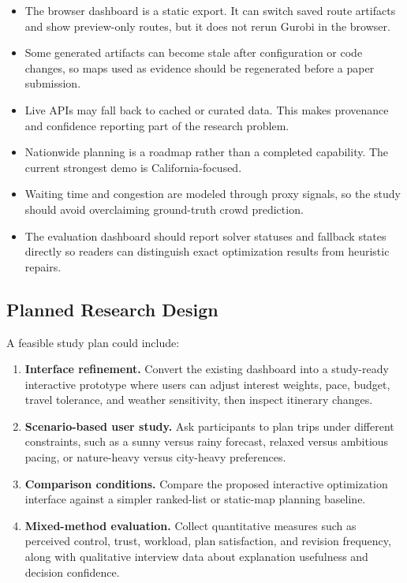 \documentclass[11pt,a4paper]{article}
\begin{document}
\begin{itemize}
    \item The browser dashboard is a static export. It can switch saved route artifacts and show preview-only routes, but it does not rerun Gurobi in the browser.
    \item Some generated artifacts can become stale after configuration or code changes, so maps used as evidence should be regenerated before a paper submission.
    \item Live APIs may fall back to cached or curated data. This makes provenance and confidence reporting part of the research problem.
    \item Nationwide planning is a roadmap rather than a completed capability. The current strongest demo is California-focused.
    \item Waiting time and congestion are modeled through proxy signals, so the study should avoid overclaiming ground-truth crowd prediction.
    \item The evaluation dashboard should report solver statuses and fallback states directly so readers can distinguish exact optimization results from heuristic repairs.
\end{itemize}

\subsection*{Planned Research Design}

\noindent A feasible study plan could include:

\begin{enumerate}
    \item \textbf{Interface refinement.} Convert the existing dashboard into a study-ready interactive prototype where users can adjust interest weights, pace, budget, travel tolerance, and weather sensitivity, then inspect itinerary changes.
    \item \textbf{Scenario-based user study.} Ask participants to plan trips under different constraints, such as a sunny versus rainy forecast, relaxed versus ambitious pacing, or nature-heavy versus city-heavy preferences.
    \item \textbf{Comparison conditions.} Compare the proposed interactive optimization interface against a simpler ranked-list or static-map planning baseline.
    \item \textbf{Mixed-method evaluation.} Collect quantitative measures such as perceived control, trust, workload, plan satisfaction, and revision frequency, along with qualitative interview data about explanation usefulness and decision confidence.
\end{enumerate}
\end{document}
